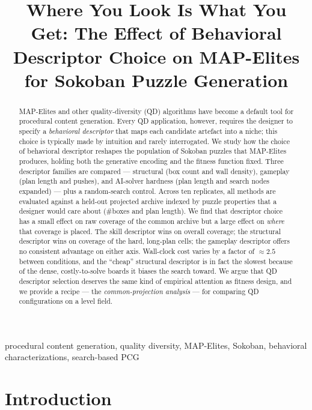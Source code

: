 \documentclass[conference]{IEEEtran}
\begin{document}
\title{Where You Look Is What You Get: The Effect of Behavioral
Descriptor Choice on MAP-Elites for Sokoban Puzzle Generation}

\author{}

\maketitle

\begin{abstract}
MAP-Elites and other quality-diversity (QD) algorithms have become a
default tool for procedural content generation. Every QD application,
however, requires the designer to specify a \emph{behavioral
descriptor} that maps each candidate artefact into a niche; this
choice is typically made by intuition and rarely interrogated. We
study how the choice of behavioral descriptor reshapes the population
of Sokoban puzzles that MAP-Elites produces, holding both the
generative encoding and the fitness function fixed. Three descriptor
families are compared --- structural (box count and wall density),
gameplay (plan length and pushes), and AI-solver hardness (plan
length and search nodes expanded) --- plus a random-search control.
Across ten replicates, all methods are evaluated against a held-out
projected archive indexed by puzzle properties that a designer would
care about (\#boxes and plan length). We find that descriptor choice
has a small effect on raw coverage of the common archive but a large
effect on \emph{where} that coverage is placed. The skill descriptor
wins on overall coverage; the structural descriptor wins on coverage
of the hard, long-plan cells; the gameplay descriptor offers no
consistent advantage on either axis. Wall-clock cost varies by a
factor of $\approx 2.5$ between conditions, and the ``cheap''
structural descriptor is in fact the slowest because of the dense,
costly-to-solve boards it biases the search toward. We argue that QD
descriptor selection deserves the same kind of empirical attention as
fitness design, and we provide a recipe --- the
\emph{common-projection analysis} --- for comparing QD configurations
on a level field.
\end{abstract}

\begin{IEEEkeywords}
procedural content generation, quality diversity, MAP-Elites,
Sokoban, behavioral characterizations, search-based PCG
\end{IEEEkeywords}

\section{Introduction}
\label{sec:intro}
\end{document}
